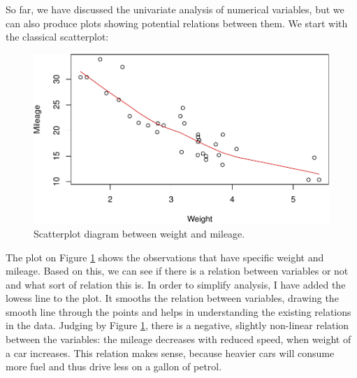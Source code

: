 \documentclass[
]{book}
\newenvironment{Shaded}{\begin{snugshade}}{\end{snugshade}}
\newcommand{\DataTypeTok}[1]{\textcolor[rgb]{0.13,0.29,0.53}{#1}}
\newcommand{\KeywordTok}[1]{\textcolor[rgb]{0.13,0.29,0.53}{\textbf{#1}}}
\newcommand{\NormalTok}[1]{#1}
\newcommand{\OperatorTok}[1]{\textcolor[rgb]{0.81,0.36,0.00}{\textbf{#1}}}
\newcommand{\StringTok}[1]{\textcolor[rgb]{0.31,0.60,0.02}{#1}}
\theoremstyle{definition}
\theoremstyle{definition}
\theoremstyle{definition}
\theoremstyle{definition}
\theoremstyle{remark}
\begin{document}
So far, we have discussed the univariate analysis of numerical variables, but we can also produce plots showing potential relations between them. We start with the classical scatterplot:

\begin{Shaded}
\end{Shaded}

\begin{figure}
\centering
\includegraphics{Svetunkov---Statistics-for-Business-Analytics_files/figure-latex/scatterWeightMPG-1.pdf}
\caption{\label{fig:scatterWeightMPG}Scatterplot diagram between weight and mileage.}
\end{figure}

The plot on Figure \ref{fig:scatterWeightMPG} shows the observations that have specific weight and mileage. Based on this, we can see if there is a relation between variables or not and what sort of relation this is. In order to simplify analysis, I have added the lowess line to the plot. It smooths the relation between variables, drawing the smooth line through the points and helps in understanding the existing relations in the data. Judging by Figure \ref{fig:scatterWeightMPG}, there is a negative, slightly non-linear relation between the variables: the mileage decreases with reduced speed, when weight of a car increases. This relation makes sense, because heavier cars will consume more fuel and thus drive less on a gallon of petrol.
\end{document}
